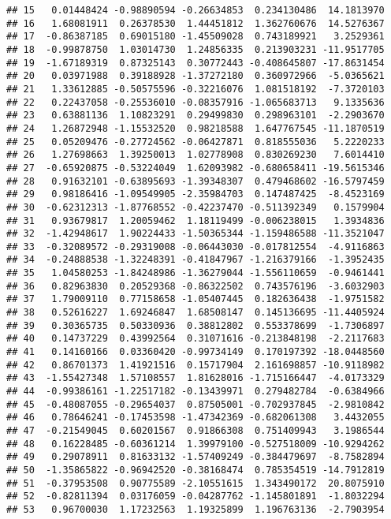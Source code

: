 \documentclass[
]{article}
\begin{document}
\begin{verbatim}
## 15   0.01448424 -0.98890594 -0.26634853  0.234130486  14.1813970
## 16   1.68081911  0.26378530  1.44451812  1.362760676  14.5276367
## 17  -0.86387185  0.69015180 -1.45509028  0.743189921   3.2529361
## 18  -0.99878750  1.03014730  1.24856335  0.213903231 -11.9517705
## 19  -1.67189319  0.87325143  0.30772443 -0.408645807 -17.8631454
## 20   0.03971988  0.39188928 -1.37272180  0.360972966  -5.0365621
## 21   1.33612885 -0.50575596 -0.32216076  1.081518192  -7.3720103
## 22   0.22437058 -0.25536010 -0.08357916 -1.065683713   9.1335636
## 23   0.63881136  1.10823291  0.29499830  0.298963101  -2.2903670
## 24   1.26872948 -1.15532520  0.98218588  1.647767545 -11.1870519
## 25   0.05209476 -0.27724562 -0.06427871  0.818555036   5.2220233
## 26   1.27698663  1.39250013  1.02778908  0.830269230   7.6014410
## 27  -0.65920875 -0.53224049  1.62093982 -0.680658411 -19.5615346
## 28   0.91632101 -0.63895693 -1.39348307  0.479468602 -16.5797459
## 29   0.98186416 -1.09549905 -2.35984703  0.147487425  -8.4523169
## 30  -0.62312313 -1.87768552 -0.42237470 -0.511392349   0.1579904
## 31   0.93679817  1.20059462  1.18119499 -0.006238015   1.3934836
## 32  -1.42948617  1.90224433 -1.50365344 -1.159486588 -11.3521047
## 33  -0.32089572 -0.29319008 -0.06443030 -0.017812554  -4.9116863
## 34  -0.24888538 -1.32248391 -0.41847967 -1.216379166  -1.3952435
## 35   1.04580253 -1.84248986 -1.36279044 -1.556110659  -0.9461441
## 36   0.82963830  0.20529368 -0.86322502  0.743576196  -3.6032903
## 37   1.79009110  0.77158658 -1.05407445  0.182636438  -1.9751582
## 38   0.52616227  1.69246847  1.68508147  0.145136695 -11.4405924
## 39   0.30365735  0.50330936  0.38812802  0.553378699  -1.7306897
## 40   0.14737229  0.43992564  0.31071616 -0.213848198  -2.2117683
## 41   0.14160166  0.03360420 -0.99734149  0.170197392 -18.0448560
## 42   0.86701373  1.41921516  0.15717904  2.161698857 -10.9118982
## 43  -1.55427348  1.57108557  1.81628016 -1.715166447  -4.0173329
## 44  -0.99386161 -1.22517182 -0.13439971  0.279482784  -0.6384966
## 45  -0.48087055 -0.29654037  0.87505001 -0.702937845  -2.9810842
## 46   0.78646241 -0.17453598 -1.47342369 -0.682061308   3.4432055
## 47  -0.21549045  0.60201567  0.91866308  0.751409943   3.1986544
## 48   0.16228485 -0.60361214  1.39979100 -0.527518009 -10.9294262
## 49   0.29078911  0.81633132 -1.57409249 -0.384479697  -8.7582894
## 50  -1.35865822 -0.96942520 -0.38168474  0.785354519 -14.7912819
## 51  -0.37953508  0.90775589 -2.10551615  1.343490172  20.8075910
## 52  -0.82811394  0.03176059 -0.04287762 -1.145801891  -1.8032294
## 53   0.96700030  1.17232563  1.19325899  1.196763136  -2.7903954

\end{verbatim}
\end{document}
